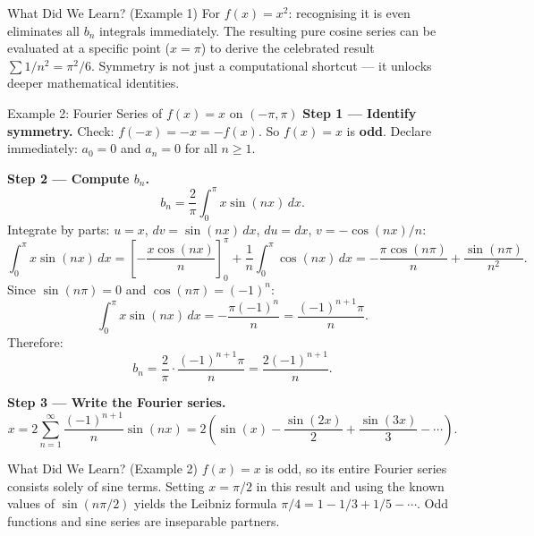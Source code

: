 \documentclass[12pt,a4paper]{article}
\begin{document}
\begin{learnbox}{What Did We Learn? (Example 1)}
For $f(x) = x^2$: recognising it is even eliminates all $b_n$ integrals immediately.
The resulting pure cosine series can be evaluated at a specific point ($x = \pi$) to derive
the celebrated result $\sum 1/n^2 = \pi^2/6$. Symmetry is not just a computational shortcut
--- it unlocks deeper mathematical identities.
\end{learnbox}

\begin{infobox}{Example 2: Fourier Series of $f(x) = x$ on $(-\pi, \pi)$}
\textbf{Step 1 --- Identify symmetry.}
Check: $f(-x) = -x = -f(x)$. So $f(x) = x$ is \textbf{odd}.
Declare immediately: $a_0 = 0$ and $a_n = 0$ for all $n \geq 1$.

\medskip
\textbf{Step 2 --- Compute $b_n$.}
\[
  b_n = \frac{2}{\pi}\int_{0}^{\pi} x\sin(nx)\,dx.
\]
Integrate by parts: $u = x$, $dv = \sin(nx)\,dx$, $du = dx$, $v = -\cos(nx)/n$:
\[
  \int_{0}^{\pi} x\sin(nx)\,dx
  = \left[-\frac{x\cos(nx)}{n}\right]_{0}^{\pi}
    + \frac{1}{n}\int_{0}^{\pi}\cos(nx)\,dx
  = -\frac{\pi\cos(n\pi)}{n} + \frac{\sin(n\pi)}{n^2}.
\]
Since $\sin(n\pi) = 0$ and $\cos(n\pi) = (-1)^n$:
\[
  \int_{0}^{\pi} x\sin(nx)\,dx = -\frac{\pi(-1)^n}{n} = \frac{(-1)^{n+1}\pi}{n}.
\]
Therefore:
\[
  b_n = \frac{2}{\pi}\cdot\frac{(-1)^{n+1}\pi}{n} = \frac{2(-1)^{n+1}}{n}.
\]

\textbf{Step 3 --- Write the Fourier series.}
\[
  x = 2\sum_{n=1}^{\infty}\frac{(-1)^{n+1}}{n}\sin(nx)
    = 2\left(\sin(x) - \frac{\sin(2x)}{2} + \frac{\sin(3x)}{3} - \cdots\right).
\]
\end{infobox}

\begin{learnbox}{What Did We Learn? (Example 2)}
$f(x) = x$ is odd, so its entire Fourier series consists solely of sine terms. Setting $x =
\pi/2$ in this result and using the known values of $\sin(n\pi/2)$ yields the Leibniz formula
$\pi/4 = 1 - 1/3 + 1/5 - \cdots$. Odd functions and sine series are inseparable partners.
\end{learnbox}
\end{document}
